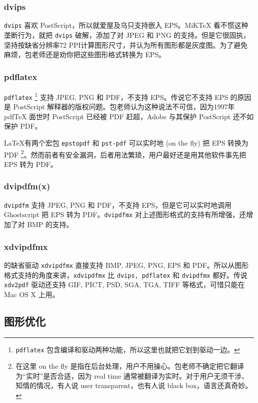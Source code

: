 \subsubsection{dvips}

\texttt{dvips} 喜欢 PostScript，所以就爱屋及乌只支持嵌入 EPS。MiKTeX 看不惯这种垄断行为，就把 \texttt{dvips} 破解，添加了对 JPEG 和 PNG 的支持。但是它很固执，坚持按缺省分辨率72 PPI计算图形尺寸，并认为所有图形都是灰度图。为了避免麻烦，包老师还是劝你把这些图形格式转换为 EPS。

\subsubsection{pdflatex}
\texttt{pdflatex} \footnote{\texttt{pdflatex} 包含编译和驱动两种功能，所以这里也就把它划到驱动一边。} 支持 JPEG, PNG 和 PDF，不支持 EPS。传说它不支持 EPS 的原因是 PostScript 解释器的版权问题。包老师认为这种说法不可信，因为1997年 pdfTeX 面世时 PostScript 已经被 PDF 赶超，Adobe 与其保护 PostScript 还不如保护 PDF。

\LaTeX 有两个宏包 \texttt{epstopdf} 和 \texttt{pst-pdf} 可以实时地 (on the fly) 把 EPS 转换为 PDF \footnote{在这里 on the fly 是指在后台处理，用户不用操心。包老师不确定把它翻译为“实时”是否合适，因为 real time 通常被翻译为实时。对于用户无须干涉、知情的情况，有人说 user transparent，也有人说 black box，语言还真奇妙。}。然而前者有安全漏洞，后者用法繁琐，用户最好还是用其他软件事先把 EPS 转为 PDF。

\subsubsection{dvipdfm(x)}

\texttt{dvipdfm} 支持 JPEG, PNG 和 PDF，不支持 EPS，但是它可以实时地调用 Ghostscript 把 EPS 转为 PDF。\texttt{dvipdfmx} 对上述图形格式的支持有所增强，还增加了对 BMP 的支持。

\subsubsection{xdvipdfmx}

\XeLaTeX 的缺省驱动 \texttt{xdvipdfmx} 直接支持 BMP, JPEG, PNG, EPS 和 PDF。所以从图形格式支持的角度来讲，\texttt{xdvipdfmx} 比 \texttt{dvips, pdflatex} 和 \texttt{dvipdfmx} 都好。传说 \texttt{xdv2pdf} 驱动还支持 GIF, PICT, PSD, SGA, TGA, TIFF 等格式，可惜只能在 Mac OS X 上用。

\subsection{图形优化}

